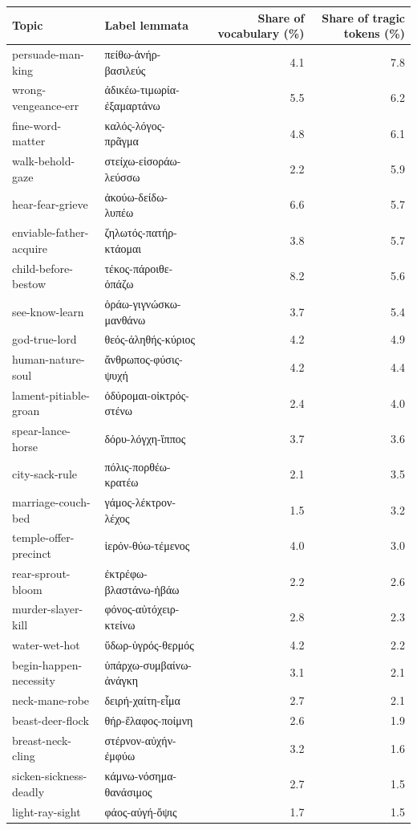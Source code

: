 \documentclass{article}
\theoremstyle{plain}
\theoremstyle{definition}
\theoremstyle{remark}
\begin{document}
\begin{table}[htbp]
\centering
\begin{tabular*}{\textwidth}{@{\extracolsep{\fill}}llrr}
\toprule
Topic & Label lemmata & Share of vocabulary (\%) & Share of tragic tokens (\%) \\
\midrule
persuade-man-king & πείθω-ἀνήρ-βασιλεύς & 4.1 & 7.8 \\
wrong-vengeance-err & ἀδικέω-τιμωρία-ἐξαμαρτάνω & 5.5 & 6.2 \\
fine-word-matter & καλός-λόγος-πρᾶγμα & 4.8 & 6.1 \\
walk-behold-gaze & στείχω-εἰσοράω-λεύσσω & 2.2 & 5.9 \\
hear-fear-grieve & ἀκούω-δείδω-λυπέω & 6.6 & 5.7 \\
enviable-father-acquire & ζηλωτός-πατήρ-κτάομαι & 3.8 & 5.7 \\
child-before-bestow & τέκος-πάροιθε-ὀπάζω & 8.2 & 5.6 \\
see-know-learn & ὁράω-γιγνώσκω-μανθάνω & 3.7 & 5.4 \\
god-true-lord & θεός-ἀληθής-κύριος & 4.2 & 4.9 \\
human-nature-soul & ἄνθρωπος-φύσις-ψυχή & 4.2 & 4.4 \\
lament-pitiable-groan & ὀδύρομαι-οἰκτρός-στένω & 2.4 & 4.0 \\
spear-lance-horse & δόρυ-λόγχη-ἵππος & 3.7 & 3.6 \\
city-sack-rule & πόλις-πορθέω-κρατέω & 2.1 & 3.5 \\
marriage-couch-bed & γάμος-λέκτρον-λέχος & 1.5 & 3.2 \\
temple-offer-precinct & ἱερόν-θύω-τέμενος & 4.0 & 3.0 \\
rear-sprout-bloom & ἐκτρέφω-βλαστάνω-ἡβάω & 2.2 & 2.6 \\
murder-slayer-kill & φόνος-αὐτόχειρ-κτείνω & 2.8 & 2.3 \\
water-wet-hot & ὕδωρ-ὑγρός-θερμός & 4.2 & 2.2 \\
begin-happen-necessity & ὑπάρχω-συμβαίνω-ἀνάγκη & 3.1 & 2.1 \\
neck-mane-robe & δειρή-χαίτη-εἷμα & 2.7 & 2.1 \\
beast-deer-flock & θήρ-ἔλαφος-ποίμνη & 2.6 & 1.9 \\
breast-neck-cling & στέρνον-αὐχήν-ἐμφύω & 3.2 & 1.6 \\
sicken-sickness-deadly & κάμνω-νόσημα-θανάσιμος & 2.7 & 1.5 \\
light-ray-sight & φάος-αὐγή-ὄψις & 1.7 & 1.5 \\

\end{tabular*}
\end{table}
\end{document}
